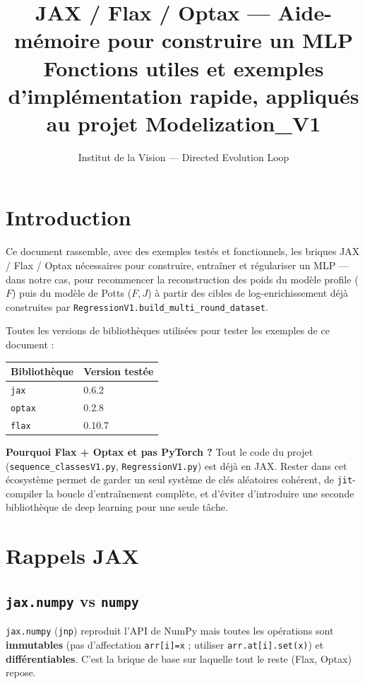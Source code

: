 \documentclass[11pt,a4paper]{article}
\title{\textbf{JAX / Flax / Optax --- Aide-mémoire pour construire un MLP}\\
\large Fonctions utiles et exemples d'implémentation rapide, appliqués au projet Modelization\_V1}
\author{Institut de la Vision --- Directed Evolution Loop}
\date{}
\begin{document}
\maketitle
\tableofcontents
\newpage

\section{Introduction}

Ce document rassemble, avec des exemples testés et fonctionnels, les briques
JAX / Flax / Optax nécessaires pour construire, entraîner et régulariser un
MLP --- dans notre cas, pour recommencer la reconstruction des poids du modèle
profile ($F$) puis du modèle de Potts ($F, J$) à partir des cibles de
log-enrichissement déjà construites par \texttt{RegressionV1.build\_multi\_round\_dataset}.

Toutes les versions de bibliothèques utilisées pour tester les exemples de ce
document :
\begin{center}
\begin{tabular}{ll}
\toprule
Bibliothèque & Version testée \\
\midrule
\texttt{jax}   & 0.6.2 \\
\texttt{optax} & 0.2.8 \\
\texttt{flax}  & 0.10.7 \\
\bottomrule
\end{tabular}
\end{center}

\begin{mdframed}
\textbf{Pourquoi Flax + Optax et pas PyTorch ?} Tout le code du projet
(\texttt{sequence\_classesV1.py}, \texttt{RegressionV1.py}) est déjà en JAX.
Rester dans cet écosystème permet de garder un seul système de clés
aléatoires cohérent, de \texttt{jit}-compiler la boucle d'entraînement
complète, et d'éviter d'introduire une seconde bibliothèque de deep learning
pour une seule tâche.
\end{mdframed}

\section{Rappels JAX}

\subsection{\texttt{jax.numpy} vs \texttt{numpy}}
\texttt{jax.numpy} (\texttt{jnp}) reproduit l'API de NumPy mais toutes les
opérations sont \textbf{immutables} (pas d'affectation \texttt{arr[i]=x} ;
utiliser \texttt{arr.at[i].set(x)}) et \textbf{différentiables}. C'est la
brique de base sur laquelle tout le reste (Flax, Optax) repose.
\end{document}
